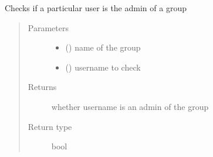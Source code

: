 \documentclass[letterpaper,10pt,english]{sphinxmanual}
\begin{document}
\begin{fulllineitems}
\label{\detokenize{db:db.isGroupAdmin}}
Checks if a particular user is the admin of a group
\begin{quote}\begin{description}
\item[{Parameters}] \leavevmode\begin{itemize}
\item {} 
 () \textendash{} name of the group

\item {} 
 () \textendash{} username to check

\end{itemize}

\item[{Returns}] \leavevmode
whether username is an admin of the group

\item[{Return type}] \leavevmode
bool

\end{description}\end{quote}

\end{fulllineitems}


\begin{fulllineitems}
\label{\detokenize{db:db.addUserToGroup}}
\end{fulllineitems}


\begin{fulllineitems}
\label{\detokenize{db:db.getGroupMembers}}
\end{fulllineitems}
\end{document}
